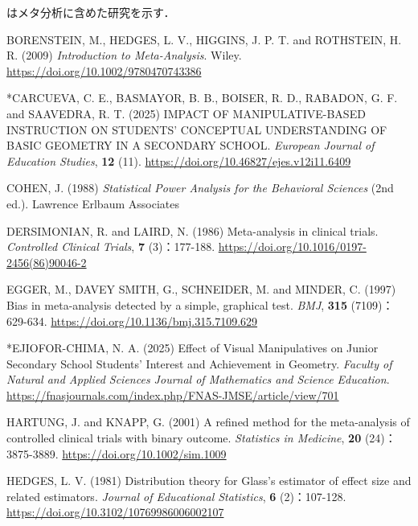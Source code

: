 \documentclass[
  lualatex, ja=standard, paper={182mm,257mm}, twocolumn, fontsize=8.5pt, baselineskip=13.5pt,
  line_length=24zw, column_gap=6.1mm, number_of_lines=45, head_space=24.5mm, gutter=16.25mm
]{jlreq}
\newcommand{\chapspaced}[1]{\par\vspace{13.5pt}\needspace{4\baselineskip}{\centering\gtfamily\bfseries #1\par}\nopagebreak}
\begin{document}
\chapspaced{参考文献}
{\noindent * はメタ分析に含めた研究を示す．\par}
{\small
\par\noindent{}\zw{} BORENSTEIN, M., HEDGES, L. V., HIGGINS, J. P. T. and ROTHSTEIN, H. R. (2009) \textit{Introduction to Meta-Analysis}. Wiley. \url{https://doi.org/10.1002/9780470743386}\par
\par\noindent{}\zw{} *CARCUEVA, C. E., BASMAYOR, B. B., BOISER, R. D., RABADON, G. F. and SAAVEDRA, R. T. (2025) IMPACT OF MANIPULATIVE-BASED INSTRUCTION ON STUDENTS’ CONCEPTUAL UNDERSTANDING OF BASIC GEOMETRY IN A SECONDARY SCHOOL. \textit{European Journal of Education Studies}, \textbf{12} (11). \url{https://doi.org/10.46827/ejes.v12i11.6409}\par
\par\noindent{}\zw{} COHEN, J. (1988) \textit{Statistical Power Analysis for the Behavioral Sciences} (2nd ed.). Lawrence Erlbaum Associates\par
\par\noindent{}\zw{} DERSIMONIAN, R. and LAIRD, N. (1986) Meta-analysis in clinical trials. \textit{Controlled Clinical Trials}, \textbf{7} (3)：177-188. \url{https://doi.org/10.1016/0197-2456(86)90046-2}\par
\par\noindent{}\zw{} EGGER, M., DAVEY SMITH, G., SCHNEIDER, M. and MINDER, C. (1997) Bias in meta-analysis detected by a simple, graphical test. \textit{BMJ}, \textbf{315} (7109)：629-634. \url{https://doi.org/10.1136/bmj.315.7109.629}\par
\par\noindent{}\zw{} *EJIOFOR-CHIMA, N. A. (2025) Effect of Visual Manipulatives on Junior Secondary School Students’ Interest and Achievement in Geometry. \textit{Faculty of Natural and Applied Sciences Journal of Mathematics and Science Education}. \url{https://fnasjournals.com/index.php/FNAS-JMSE/article/view/701}\par
\par\noindent{}\zw{} HARTUNG, J. and KNAPP, G. (2001) A refined method for the meta-analysis of controlled clinical trials with binary outcome. \textit{Statistics in Medicine}, \textbf{20} (24)：3875-3889. \url{https://doi.org/10.1002/sim.1009}\par
\par\noindent{}\zw{} HEDGES, L. V. (1981) Distribution theory for Glass's estimator of effect size and related estimators. \textit{Journal of Educational Statistics}, \textbf{6} (2)：107-128. \url{https://doi.org/10.3102/10769986006002107}\par
}
\end{document}
